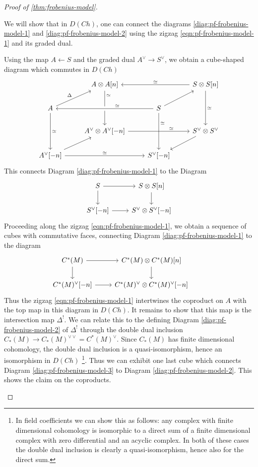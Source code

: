 \documentclass{scrartcl}
\theoremstyle{plain}
\theoremstyle{definition}
\newcommand{\quiso}{\simeq}
\newcommand{\from}{\leftarrow}
\begin{document}
\begin{proof}[Proof of \cref{thm:frobenius-model}]
\begin{enumerate}
    We will show that in $D(Ch)$, one can connect the diagrams \ref{diag:pf-frobenius-model-1} and \ref{diag:pf-frobenius-model-2} using the zigzag \ref{eqn:pf-frobenius-model-1} and its graded dual.

    Using the map $A\from S$ and the graded dual $A^\vee\to S^\vee$, we obtain a cube-shaped diagram which commutes in $D(Ch)$
    \[
        \begin{tikzcd}
            & A\otimes A[n] \ar[dd, "\quiso" {yshift=18pt}]  &&  \ar[ll, swap, "\quiso"]  S\otimes S[n]\ar[dd, "\quiso"] \\
            A \ar[dd, "\quiso"] \ar[ur, "\Delta"]  && \ar[ll, crossing over, swap, "\quiso" {xshift=18pt}] S \ar[ur] \ar[dd, crossing over, "\quiso" {yshift=12pt}] & \\
            & A^\vee\otimes A^\vee[-n] \ar[rr, "\quiso" {xshift=18pt}] &&  S^\vee\otimes S^\vee \ar[ld] \\
            A^\vee[-n] \ar[ur] \ar[rr, "\quiso" ] &&  S^\vee[-n] 
        \end{tikzcd}
    \]
    This connects Diagram \ref{diag:pf-frobenius-model-1} to the Diagram 
    \begin{equation}
        \begin{tikzcd}
            S \dar\rar & S\otimes S[n] \dar \\
            S^\vee[-n] \rar & S^\vee\otimes S^\vee[-n]
        \end{tikzcd}
    \end{equation}
    Proceeding along the zigzag \ref{eqn:pf-frobenius-model-1}, we obtain a sequence of cubes with commutative faces, connecting Diagram \ref{diag:pf-frobenius-model-1} to the diagram 
    \begin{equation}\label{diag:pf-frobenius-model-3}
        \begin{tikzcd}
        C^*(M) \dar \arrow[r] & C^{*}(M)\otimes C^*(M)[n] \dar \\
        C^*(M)^\vee[-n] \rar & C^{*}(M)^\vee\otimes C^{*}(M)^\vee[-n] &
        \end{tikzcd}
    \end{equation}
    Thus the zigzag \ref{eqn:pf-frobenius-model-1} intertwines the coproduct on $A$ with the top map in this diagram in $D(Ch)$. It remains to show that this map is the intersection map $\Delta^!$. We can relate this to the defining Diagram \ref{diag:pf-frobenius-model-2} of $\Delta^!$ through the double dual inclusion $C_*(M)\to C_*(M)^{\vee\vee} = C^*(M)^{\vee}$. Since $C_*(M)$ has finite dimensional cohomology, the double dual inclusion is a quasi-isomorphism, hence an isomorphism in $D(Ch)$ \footnote{In field coefficients we can show this as follows: any complex with finite dimensional cohomology is isomorphic to a direct sum of a finite dimensional complex with zero differential and an acyclic complex. In both of these cases the double dual inclusion is clearly a quasi-isomorphism, hence also for the direct sum. }. Thus we can exhibit one last cube which connects Diagram \ref{diag:pf-frobenius-model-3} to Diagram \ref{diag:pf-frobenius-model-2}. This shows the claim on the coproducts. 


\end{enumerate}
\end{proof}
\end{document}
